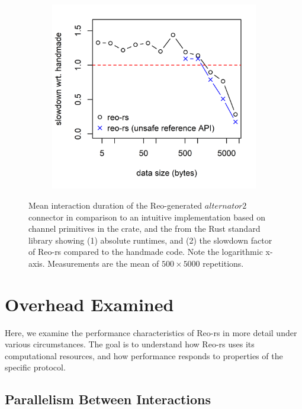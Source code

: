 \begin{figure}
{\begin{subfigure}[b]{0.63\textwidth}
			\includegraphics[width=\textwidth]{experiments/alternator_1.png}
			\caption{}
			\label{fig:alternator2_runtime_1}
		\end{subfigure}%
	}
	\caption[Hand-crafted vs.\ Reo-generated alternator.]{Mean interaction duration of the Reo-generated $alternator2$ connector in comparison to an intuitive implementation based on channel primitives in the  crate, and the  from the Rust standard library showing (1) absolute runtimes, and (2) the slowdown factor of Reo-rs compared to the handmade code. Note the logarithmic x-axis. Measurements are the mean of $500\times{}5000$ repetitions.}
	\label{fig:alternator}
	\label{fig:alternator2_runtime}
\end{figure}

\section{Overhead Examined}
\label{sec:overhead_examined}
Here, we examine the performance characteristics of Reo-rs in more detail under various circumstances. The goal is to understand how Reo-rs uses its computational resources, and how performance responds to properties of the specific protocol.

\subsection{Parallelism Between Interactions}

